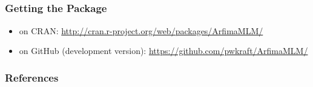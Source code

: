 \documentclass{beamer}\usepackage[]{graphicx}\usepackage[]{color}
\begin{document}
\subsection{}
\begin{frame}
\frametitle{Getting the Package}
\begin{itemize}
\item on CRAN: \url{http://cran.r-project.org/web/packages/ArfimaMLM/}
\item on GitHub (development version): \url{https://github.com/pwkraft/ArfimaMLM/}
\end{itemize}
\end{frame}

 \begin{frame}
   \frametitle{References}
   \def\newblock{\hskip .11em plus .33em minus .07em}
   
   
 \end{frame}
\end{document}
